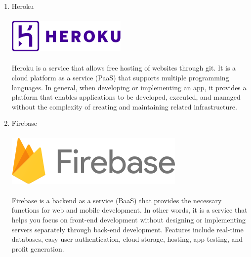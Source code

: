 \documentclass[conference]{IEEEtran}
\begin{document}
\begin{enumerate}
    \item Heroku\\\\
    \includegraphics{assets/Heroku.png}
    \\ \\ Heroku is a service that allows free hosting of websites through git. It is a cloud platform as a service (PaaS) that supports multiple programming languages. In general, when developing or implementing an app, it provides a platform that enables applications to be developed, executed, and managed without the complexity of creating and maintaining related infrastructure. \\
    
    \break
    
    \item Firebase\\\\
    \includegraphics[scale=0.7]{assets/firebase.png}
    \\ \\ Firebase is a backend as a service (BaaS) that provides the necessary functions for web and mobile development. In other words, it is a service that helps you focus on front-end development without designing or implementing servers separately through back-end development. Features include real-time databases, easy user authentication, cloud storage, hosting, app testing, and profit generation. \\
    

\end{enumerate}
\end{document}
